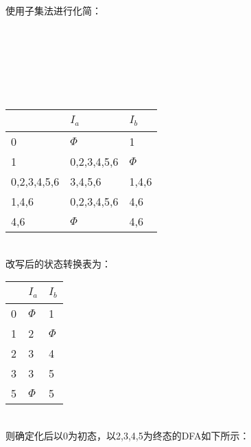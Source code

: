 \documentclass{article}
\begin{document}
使用子集法进行化简：\\ \\ \\ \\ \\ \\ \\ 
\begin{table}[h]
    \centering
\begin{tabular}{|p{5cm}<{\centering}|p{5cm}<{\centering}|p{5cm}<{\centering}|}   
    \hline
    \ & $I_a$ & $I_b$ \\
    \hline
    0 & $\Phi$ & 1 \\
    \hline
    1 & 0,2,3,4,5,6 & $\Phi$ \\
    \hline
    0,2,3,4,5,6 & 3,4,5,6 & 1,4,6 \\
    \hline
    1,4,6 & 0,2,3,4,5,6 & 4,6 \\
    \hline
    4,6 & $\Phi$ & 4,6 \\
    \hline
\end{tabular}
\end{table}
\\
改写后的状态转换表为：
\begin{table}[h]
    \centering
\begin{tabular}{|p{5cm}<{\centering}|p{5cm}<{\centering}|p{5cm}<{\centering}|}   
    \hline
    \ & $I_a$ & $I_b$ \\
    \hline
    0 & $\Phi$ & 1 \\
    \hline
    1 & 2 & $\Phi$ \\
    \hline
    2 & 3 & 4 \\
    \hline
    3 & 3 & 5 \\
    \hline
    5 & $\Phi$ & 5 \\
    \hline
\end{tabular}
\end{table}
\\
则确定化后以0为初态，以2,3,4,5为终态的DFA如下所示：
\end{document}
